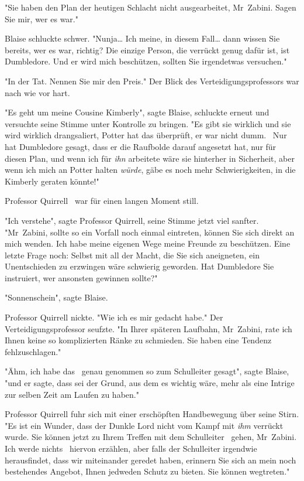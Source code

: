 {"Sie haben den Plan der heutigen Schlacht nicht ausgearbeitet, Mr~Zabini. Sagen Sie mir, wer es war."

Blaise schluckte schwer. "Nunja… Ich meine, in diesem Fall… dann wissen Sie bereits, wer es war, richtig? Die einzige Person, die verrückt genug dafür ist, ist Dumbledore. Und er wird mich beschützen, sollten Sie irgendetwas versuchen."

"In der Tat. Nennen Sie mir den Preis." Der Blick des Verteidigungsprofessors war nach wie vor hart.

"Es geht um meine Cousine Kimberly", sagte Blaise, schluckte erneut und versuchte seine Stimme unter Kontrolle zu bringen. "Es gibt sie wirklich und sie wird wirklich drangsaliert, Potter hat das überprüft, er war nicht dumm. ~Nur hat Dumbledore gesagt, dass er die Raufbolde darauf angesetzt hat, nur für diesen Plan, und wenn ich für \emph{ihn} arbeitete wäre sie hinterher in Sicherheit, aber wenn ich mich an Potter halten \emph{würde}, gäbe es noch mehr Schwierigkeiten, in die Kimberly geraten könnte!"

Professor Quirrell ~war für einen langen Moment still.

"Ich verstehe", sagte Professor Quirrell, seine Stimme jetzt viel sanfter. "Mr~Zabini, sollte so ein Vorfall noch einmal eintreten, können Sie sich direkt an mich wenden. Ich habe meine eigenen Wege meine Freunde zu beschützen. Eine letzte Frage noch: Selbst mit all der Macht, die Sie sich aneigneten, ein Unentschieden zu erzwingen wäre schwierig geworden. Hat Dumbledore Sie instruiert, wer ansonsten gewinnen sollte?"

"Sonnenschein", sagte Blaise.

Professor Quirrell nickte. "Wie ich es mir gedacht habe." Der Verteidigungsprofessor seufzte. "In Ihrer späteren Laufbahn, Mr~Zabini, rate ich Ihnen keine so komplizierten Ränke zu schmieden. Sie haben eine Tendenz fehlzuschlagen."

"Ähm, ich habe das ~genau genommen so zum Schulleiter gesagt", sagte Blaise, "und er sagte, dass sei der Grund, aus dem es wichtig wäre, mehr als eine Intrige zur selben Zeit am Laufen zu haben."

Professor Quirrell fuhr sich mit einer erschöpften Handbewegung über seine Stirn. "Es ist ein Wunder, dass der Dunkle Lord nicht vom Kampf mit \emph{ihm} verrückt wurde. Sie können jetzt zu Ihrem Treffen mit dem Schulleiter ~gehen, Mr~Zabini. Ich werde nichts ~hiervon erzählen, aber falls der Schulleiter irgendwie herausfindet, dass wir miteinander geredet haben, erinnern Sie sich an mein noch bestehendes Angebot, Ihnen jedweden Schutz zu bieten. Sie können wegtreten."

}
